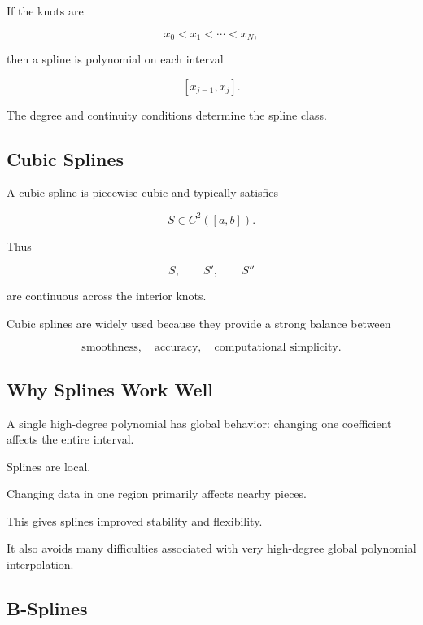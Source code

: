 If the knots are

\[
x_0<x_1<\cdots<x_N,
\]

then a spline is polynomial on each interval

\[
[x_{j-1},x_j].
\]

The degree and continuity conditions determine the spline class.

\subsection{Cubic Splines}
\label{subsec:cubic-splines}

A cubic spline is piecewise cubic and typically satisfies

\[
\boxed{
S\in C^2([a,b]).
}
\]

Thus

\[
S,
\qquad
S',
\qquad
S''
\]

are continuous across the interior knots.

Cubic splines are widely used because they provide a strong balance
between

\[
\boxed{
\text{smoothness},
\quad
\text{accuracy},
\quad
\text{computational simplicity}.
}
\]

\subsection{Why Splines Work Well}
\label{subsec:why-splines-work}

A single high-degree polynomial has global behavior: changing one
coefficient affects the entire interval.

Splines are local.

Changing data in one region primarily affects nearby pieces.

This gives splines improved stability and flexibility.

It also avoids many difficulties associated with very high-degree global
polynomial interpolation.

\subsection{B-Splines}
\label{subsec:b-splines}

